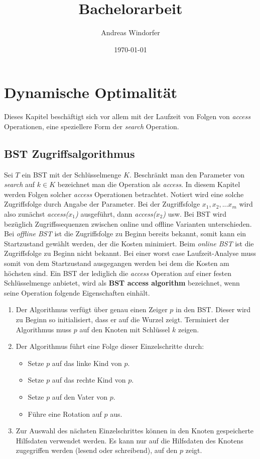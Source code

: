 \documentclass[a4paper,12pt]{article}
\title{Bachelorarbeit}
\author{
Andreas Windorfer\\
}
\date{\today}
\begin{document}
\maketitle
\newpage

\tableofcontents
\newpage

\section{Dynamische Optimalität}
Dieses Kapitel beschäftigt sich vor allem mit der Laufzeit von Folgen von \textit{access} Operationen, eine speziellere Form der \textit{search} Operation.  
\subsection{BST Zugriffsalgorithmus }
Sei $T$ ein BST mit der Schlüsselmenge $K$. Beschränkt man den Parameter von \textit{search} auf $k \in K $ bezeichnet man die Operation als \textit{access}. In diesem Kapitel werden Folgen solcher \textit{access} Operationen betrachtet. Notiert wird eine solche Zugriffsfolge durch Angabe der Parameter. Bei der Zugriffsfolge $x_1,x_2,...x_m$ wird also zunächst \textit{access($x_1$)} ausgeführt, dann \textit{access($x_2$)} usw.  Bei BST wird bezüglich Zugriffssequenzen zwischen online und offline Varianten unterschieden. Bei \textit{offline BST} ist die Zugriffsfolge zu Beginn bereits bekannt, somit kann ein Startzustand gewählt werden, der die Kosten minimiert. Beim \textit{online BST} ist die Zugriffsfolge zu Beginn nicht bekannt. Bei einer worst case Laufzeit-Analyse muss somit von dem Startzustand ausgegangen werden bei dem die Kosten am höchsten sind.
Ein BST der lediglich die \textit{access} Operation auf einer festen Schlüsselmenge anbietet, wird als \textbf{BST access algorithm} bezeichnet, wenn seine Operation folgende Eigenschaften einhält. 

\begin{enumerate} 
	\item Der Algorithmus verfügt über genau einen Zeiger $p$ in den BST. Dieser wird zu Beginn so initialisiert, dass er auf die Wurzel zeigt. Terminiert der Algorithmus muss $p$ auf den Knoten mit Schlüssel $k$ zeigen.
	\item Der Algorithmus führt eine Folge dieser Einzelschritte durch:
	\begin{itemize}
		\item Setze $p$ auf das linke Kind von $p$.
		\item Setze $p$ auf das rechte Kind von $p$.
		\item Setze $p$ auf den Vater von $p$.
		\item Führe eine Rotation auf $p$ aus.
	\end{itemize}  
	\item  Zur Auswahl des nächsten Einzelschrittes können in den Knoten gespeicherte Hilfsdaten verwendet werden. Es kann nur auf die Hilfsdaten des Knotens zugegriffen werden (lesend oder schreibend), auf den $p$ zeigt.    
\end{enumerate}
\end{document}
